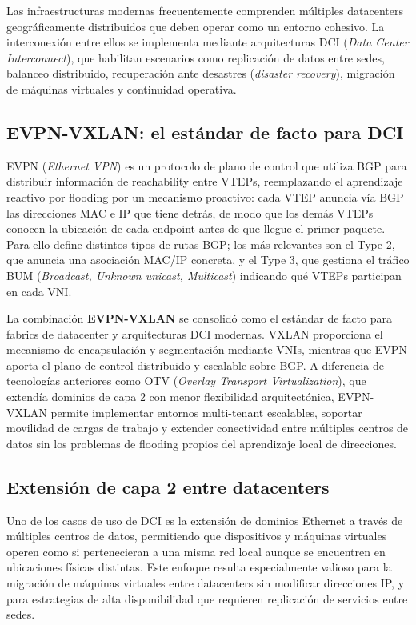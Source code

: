 
Las infraestructuras modernas frecuentemente comprenden múltiples datacenters geográficamente distribuidos que deben operar como un entorno cohesivo. La interconexión entre ellos se implementa mediante arquitecturas DCI (\textit{Data Center Interconnect}), que habilitan escenarios como replicación de datos entre sedes, balanceo distribuido, recuperación ante desastres (\textit{disaster recovery}), migración de máquinas virtuales y continuidad operativa.

\subsection{EVPN-VXLAN: el estándar de facto para DCI}

EVPN (\textit{Ethernet VPN}) es un protocolo de plano de control que utiliza BGP para distribuir información de reachability entre VTEPs, reemplazando el aprendizaje reactivo por flooding por un mecanismo proactivo: cada VTEP anuncia vía BGP las direcciones MAC e IP que tiene detrás, de modo que los demás VTEPs conocen la ubicación de cada endpoint antes de que llegue el primer paquete. Para ello define distintos tipos de rutas BGP; los más relevantes son el Type 2, que anuncia una asociación MAC/IP concreta, y el Type 3, que gestiona el tráfico BUM (\textit{Broadcast, Unknown unicast, Multicast}) indicando qué VTEPs participan en cada VNI.

La combinación \textbf{EVPN-VXLAN} se consolidó como el estándar de facto para fabrics de datacenter y arquitecturas DCI modernas. VXLAN proporciona el mecanismo de encapsulación y segmentación mediante VNIs, mientras que EVPN aporta el plano de control distribuido y escalable sobre BGP. A diferencia de tecnologías anteriores como OTV (\textit{Overlay Transport Virtualization}), que extendía dominios de capa 2 con menor flexibilidad arquitectónica, EVPN-VXLAN permite implementar entornos multi-tenant escalables, soportar movilidad de cargas de trabajo y extender conectividad entre múltiples centros de datos sin los problemas de flooding propios del aprendizaje local de direcciones.

\subsection{Extensión de capa 2 entre datacenters}

Uno de los casos de uso de DCI es la extensión de dominios Ethernet a través de múltiples centros de datos, permitiendo que dispositivos y máquinas virtuales operen como si pertenecieran a una misma red local aunque se encuentren en ubicaciones físicas distintas. Este enfoque resulta especialmente valioso para la migración de máquinas virtuales entre datacenters sin modificar direcciones IP, y para estrategias de alta disponibilidad que requieren replicación de servicios entre sedes.

